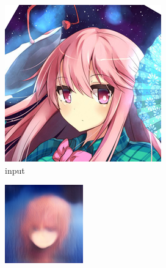 \documentclass{article}
\begin{document}
\begin{figure}[h!]
    \caption{Dataset Anime}
     \centering
     \begin{subfigure}[b]{0.24\textwidth}
         \centering
         \includegraphics[width=\textwidth]{illustration/anime_input.png}
         \caption{input}
     \end{subfigure}
     \begin{subfigure}[b]{0.24\textwidth}
         \centering
         \includegraphics[width=\textwidth]{illustration/anime_biggan_500.png}

\end{subfigure}
\end{figure}
\end{document}

